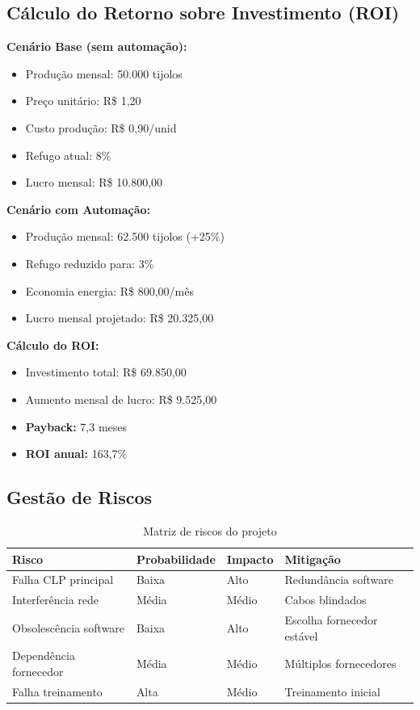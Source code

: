 \documentclass[12pt,a4paper]{article}
\begin{document}
\subsection{Cálculo do Retorno sobre Investimento (ROI)}

\textbf{Cenário Base (sem automação):}
\begin{itemize}
    \item Produção mensal: 50.000 tijolos
    \item Preço unitário: R\$ 1,20
    \item Custo produção: R\$ 0,90/unid
    \item Refugo atual: 8\%
    \item Lucro mensal: R\$ 10.800,00
\end{itemize}

\textbf{Cenário com Automação:}
\begin{itemize}
    \item Produção mensal: 62.500 tijolos (+25\%)
    \item Refugo reduzido para: 3\%
    \item Economia energia: R\$ 800,00/mês
    \item Lucro mensal projetado: R\$ 20.325,00
\end{itemize}

\textbf{Cálculo do ROI:}
\begin{itemize}
    \item Investimento total: R\$ 69.850,00
    \item Aumento mensal de lucro: R\$ 9.525,00
    \item \textbf{Payback:} 7,3 meses
    \item \textbf{ROI anual:} 163,7\%
\end{itemize}

\subsection{Gestão de Riscos}

\begin{table}[h]
\centering
\begin{tabular}{@{}p{4cm}|p{4cm}|p{4cm}|p{3cm}@{}}
\toprule
\textbf{Risco} & \textbf{Probabilidade} & \textbf{Impacto} & \textbf{Mitigação} \\
\midrule
Falha CLP principal & Baixa & Alto & Redundância software \\
\midrule
Interferência rede & Média & Médio & Cabos blindados \\
\midrule
Obsolescência software & Baixa & Alto & Escolha fornecedor estável \\
\midrule
Dependência fornecedor & Média & Médio & Múltiplos fornecedores \\
\midrule
Falha treinamento & Alta & Médio & Treinamento inicial \\
\bottomrule
\end{tabular}
\caption{Matriz de riscos do projeto}
\end{table}
\end{document}

